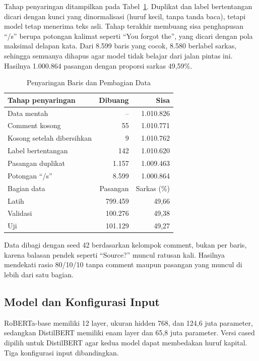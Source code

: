 \documentclass[conference]{IEEEtran}
\begin{document}
Tahap penyaringan ditampilkan pada Tabel~\ref{tab:data}. Duplikat dan label bertentangan dicari dengan kunci yang dinormalisasi (huruf kecil, tanpa tanda baca), tetapi model tetap menerima teks asli. Tahap terakhir membuang sisa penghapusan ``/s'' berupa potongan kalimat seperti ``You forgot the'', yang dicari dengan pola maksimal delapan kata. Dari 8.599 baris yang cocok, 8.580 berlabel sarkas, sehingga semuanya dihapus agar model tidak belajar dari jalan pintas ini. Hasilnya 1.000.864 pasangan dengan proporsi sarkas 49,59\%.

\begin{table}[t]
\caption{Penyaringan Baris dan Pembagian Data}
\label{tab:data}
\centering
\begin{tabular}{lrr}
\hline
Tahap penyaringan & Dibuang & Sisa \\
\hline
Data mentah & -- & 1.010.826 \\
Comment kosong & 55 & 1.010.771 \\
Kosong setelah dibersihkan & 9 & 1.010.762 \\
Label bertentangan & 142 & 1.010.620 \\
Pasangan duplikat & 1.157 & 1.009.463 \\
Potongan ``/s'' & 8.599 & 1.000.864 \\
\hline
Bagian data & Pasangan & Sarkas (\%) \\
\hline
Latih & 799.459 & 49,66 \\
Validasi & 100.276 & 49,38 \\
Uji & 101.129 & 49,27 \\
\hline
\end{tabular}
\end{table}

Data dibagi dengan seed 42 berdasarkan kelompok comment, bukan per baris, karena balasan pendek seperti ``Source?'' muncul ratusan kali. Hasilnya mendekati rasio 80/10/10 tanpa comment maupun pasangan yang muncul di lebih dari satu bagian.

\subsection{Model dan Konfigurasi Input}
RoBERTa-base \cite{liu2019roberta} memiliki 12 layer, ukuran hidden 768, dan 124,6 juta parameter, sedangkan DistilBERT \cite{sanh2019distilbert} memiliki enam layer dan 65,8 juta parameter. Versi cased dipilih untuk DistilBERT agar kedua model dapat membedakan huruf kapital. Tiga konfigurasi input dibandingkan.
\end{document}
